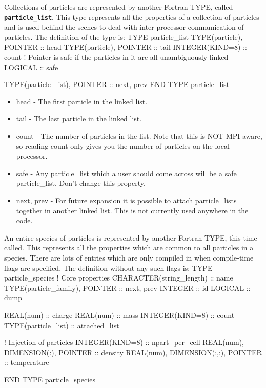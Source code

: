 \documentclass[12pt,a4paper]{article}
\newcommand{\inlinecode}[1]{{\color{warwickred} \bf\texttt{#1}}}
\newenvironment{boxverbatim}{\lboxverbatim{none}}{\endlboxverbatim}
\begin{document}
Collections of particles are represented by another Fortran TYPE, called
\inlinecode{particle\_list}. This type represents all the properties of a
collection of particles and is used behind the scenes to deal with
inter-processor communication of particles. The definition of the type is:
\begin{boxverbatim}
  TYPE particle_list
    TYPE(particle), POINTER :: head
    TYPE(particle), POINTER :: tail
    INTEGER(KIND=8) :: count
    ! Pointer is safe if the particles in it are all unambiguously linked
    LOGICAL :: safe

    TYPE(particle_list), POINTER :: next, prev
  END TYPE particle_list
\end{boxverbatim}
\begin{itemize}
\item head - The first particle in the linked list.
\item tail - The last particle in the linked list.
\item count - The number of particles in the list. Note that this is NOT MPI
  aware, so reading count only gives you the number of particles on the local
  processor.
\item safe - Any particle\_list which a user should come across will be a safe
  particle\_list. Don't change this property.
\item next, prev - For future expansion it is possible to attach particle\_lists
  together in another linked list. This is not currently used anywhere in the
  code.
\end{itemize}

An entire species of particles is represented by another Fortran TYPE, this
time called\linebreak \inlinecode{particle\_species}. This represents all the
properties which are common to all particles in a species. There are lots
of entries which are only compiled in when compile-time flags are specified.
The definition without any such flags is:
\begin{boxverbatim}
  TYPE particle_species
    ! Core properties
    CHARACTER(string_length) :: name
    TYPE(particle_family), POINTER :: next, prev
    INTEGER :: id
    LOGICAL :: dump

    REAL(num) :: charge
    REAL(num) :: mass
    INTEGER(KIND=8) :: count
    TYPE(particle_list) :: attached_list

    ! Injection of particles
    INTEGER(KIND=8) :: npart_per_cell
    REAL(num), DIMENSION(:), POINTER :: density
    REAL(num), DIMENSION(:,:), POINTER :: temperature

  END TYPE particle_species
\end{boxverbatim}
\end{document}
